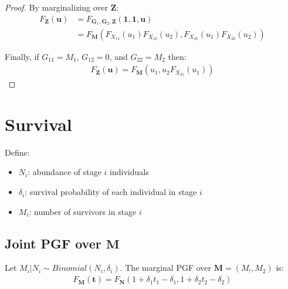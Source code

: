 \documentclass{article}
\begin{document}
\begin{proof}
By marginalizing over $\mathbf{Z}$:
\begin{align*}
F_{\mathbf{Z}}(\mathbf{u})
&=F_{\mathbf{G}_1, \mathbf{G}_2, \mathbf{Z}}(\mathbf{1}, \mathbf{1}, \mathbf{u}) \\
&= F_{\mathbf{M}}(F_{X_{11}}(u_1) F_{X_{12}}(u_2), F_{X_{21}}(u_1) F_{X_{22}}(u_2))
\end{align*}

Finally, if $G_{11}=M_1$, $G_{12}=0$, and $G_{22}=M_2$ then:
\begin{align*}
F_{\mathbf{Z}}(\mathbf{u}) = F_{\mathbf{M}}(u_1, u_2 F_{X_{21}}(u_1))
\end{align*}

\end{proof}

\section{Survival}
Define:
\begin{itemize}
\item $N_i$: abundance of stage $i$ individuals
\item $\delta_i$: survival probability of each individual in stage $i$
\item $M_i$: number of survivors in stage $i$
\end{itemize}

\subsection{Joint PGF over $\mathbf{M}$}
Let $M_i|N_i \sim Binomial(N_i, \delta_i)$. The marginal PGF over $\mathbf{M} = (M_!, M_2)$ is:
\begin{align*}
F_{\mathbf{M}}(\mathbf{t})
= F_{\mathbf{N}}(1 + \delta_1 t_1 - \delta_1, 1 + \delta_2 t_2 - \delta_2)
\end{align*}

\medskip
 


\end{document}
